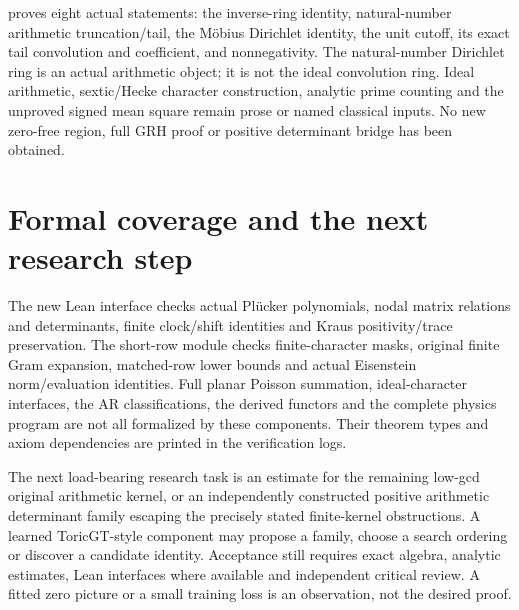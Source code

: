 \documentclass[11pt,oneside,openany]{book}
\theoremstyle{definition}\newtheorem{definition}[theorem]{Definition}
\theoremstyle{remark}\newtheorem{remark}[theorem]{Remark}
\begin{document}
 proves eight actual statements: the inverse-ring
identity, natural-number arithmetic truncation/tail, the M\"obius Dirichlet
identity, the unit cutoff, its exact tail convolution and coefficient,
and nonnegativity. The natural-number Dirichlet ring is an actual
arithmetic object; it is not the ideal convolution ring. Ideal arithmetic,
sextic/Hecke character construction, analytic prime counting and the
unproved signed mean square remain prose or named classical inputs.
No new zero-free region, full GRH proof or positive determinant bridge
has been obtained.


\section{Formal coverage and the next research step}
The new Lean interface checks actual Pl\"ucker polynomials, nodal matrix relations and determinants, finite clock/shift identities and Kraus positivity/trace preservation. The short-row module checks finite-character masks, original finite Gram expansion, matched-row lower bounds and actual Eisenstein norm/evaluation identities. Full planar Poisson summation, ideal-character interfaces, the AR classifications, the derived functors and the complete physics program are not all formalized by these components. Their theorem types and axiom dependencies are printed in the verification logs.

The next load-bearing research task is an estimate for the remaining low-gcd original arithmetic kernel, or an independently constructed positive arithmetic determinant family escaping the precisely stated finite-kernel obstructions. A learned ToricGT-style component may propose a family, choose a search ordering or discover a candidate identity. Acceptance still requires exact algebra, analytic estimates, Lean interfaces where available and independent critical review. A fitted zero picture or a small training loss is an observation, not the desired proof.

\end{document}
